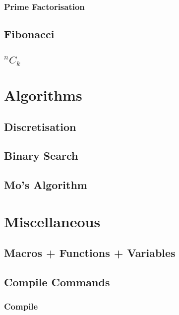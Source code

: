 \documentclass{article}
\begin{document}
\subsubsection{Prime Factorisation}


\subsection{Fibonacci}

\subsection{$^{n}C_{k}$}


\section{Algorithms}
\subsection{Discretisation}

\subsection{Binary Search}

\subsection{Mo's Algorithm}


\section{Miscellaneous}
\subsection{Macros + Functions + Variables}


\subsection{Compile Commands}
\subsubsection{Compile}

\end{document}
